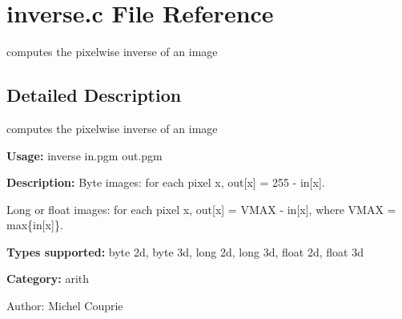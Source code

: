 \section{inverse.c File Reference}
\label{inverse_8c}
computes the pixelwise inverse of an image  




\label{_details}
\subsection{Detailed Description}
computes the pixelwise inverse of an image 

{\bf Usage:} inverse in.pgm out.pgm

{\bf Description:} Byte images: for each pixel x, out[x] = 255 - in[x].\par
 Long or float images: for each pixel x, out[x] = VMAX - in[x], where VMAX = max\{in[x]\}.

{\bf Types supported:} byte 2d, byte 3d, long 2d, long 3d, float 2d, float 3d

{\bf Category:} arith

\begin{Desc}
\item[Author:]Michel Couprie \end{Desc}
